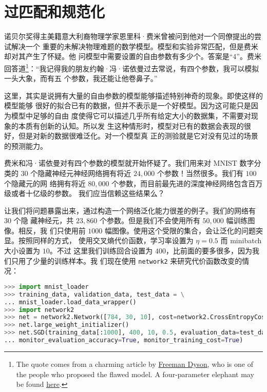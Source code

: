 \section{过匹配和规范化}
\label{sec:overfitting_and_regularization}

诺贝尔奖得主美籍意大利裔物理学家恩里科·费米曾被问到他对一个同僚提出的尝试解决一个
重要的未解决物理难题的数学模型。模型和实验非常匹配，但是费米却对其产生了怀疑。他
问模型中需要设置的自由参数有多少个。答案是``4''。费米回答道\footnote{The quote
  comes from a charming article by
  \href{http://www.nature.com/nature/journal/v427/n6972/full/427297a.html}{Freeman
    Dyson}, who is one of the people who proposed the flawed model. A
  four-parameter elephant may be found
  \href{http://www.johndcook.com/blog/2011/06/21/how-to-fit-an-elephant/}{here}.
}：“我记得我的朋友约翰·冯·诺依曼过去常说，有四个参数，我可以模拟一头大象，而有五
个参数，我还能让他卷鼻子。”

这里，其实是说拥有大量的自由参数的模型能够描述特别神奇的现象。即使这样的模型能够
很好的拟合已有的数据，但并不表示是一个好模型。因为这可能只是因为模型中足够的自由
度使得它可以描述几乎所有给定大小的数据集，不需要对现象的本质有创新的认知。所以发
生这种情形时，模型对已有的数据会表现的很好，但是对新的数据很难泛化。对一个模型真
正的测验就是它对没有见过的场景的预测能力。

费米和冯·诺依曼对有四个参数的模型就开始怀疑了。我们用来对 MNIST 数字分类的 $30$
个隐藏神经元神经网络拥有将近 $24,000$ 个参数！当然很多。我们有 $100$ 个隐藏元的网
络拥有将近 $80,000$ 个参数，而目前最先进的深度神经网络包含百万级或者十亿级的参数。
我们应当信赖这些结果么？

让我们将问题暴露出来，通过构造一个网络泛化能力很差的例子。我们的网络有 $30$ 个隐
藏神经元，共 $23,860$ 个参数。但是我们不会使用所有 $50,000$ 幅训练图像。相反，我
们只使用前 $1000$ 幅图像。使用这个受限的集合，会让泛化的问题突显。按照同样的方式，
使用交叉熵代价函数，学习率设置为 $\eta = 0.5$ 而 minibatch 大小设置为 $10$。不过
这里我们训练回合设置为 $400$，比前面的要多很多，因为我们只用了少量的训练样本。我
们现在使用 \lstinline!network2! 来研究代价函数改变的情况：

\begin{lstlisting}[language=Python]
>>> import mnist_loader 
>>> training_data, validation_data, test_data = \
... mnist_loader.load_data_wrapper()
>>> import network2 
>>> net = network2.Network([784, 30, 10], cost=network2.CrossEntropyCost) 
>>> net.large_weight_initializer()
>>> net.SGD(training_data[:1000], 400, 10, 0.5, evaluation_data=test_data,
... monitor_evaluation_accuracy=True, monitor_training_cost=True)
\end{lstlisting}

